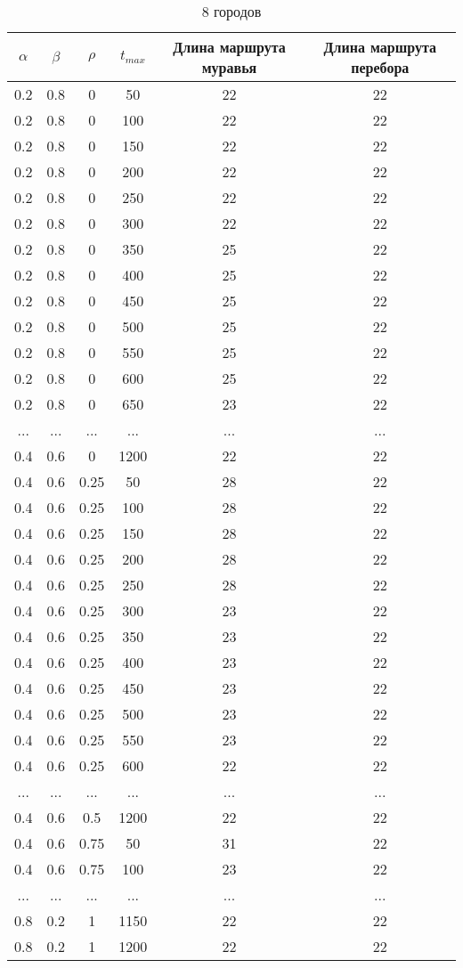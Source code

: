 \begin{table}[H]
    \centering
    \caption{8 городов}
    \label{table:city15}
    \begin{tabular}{|c|c|c|c|c|c|}
        \hline
        $\alpha$ & $\beta$ & $\rho$ & $t_{max}$ & Длина маршрута муравья & Длина маршрута перебора \\
        \hline
        0.2 & 0.8 & 0 & 50 & 22 & 22 \\
        0.2 & 0.8 & 0 & 100 & 22 & 22 \\
        0.2 & 0.8 & 0 & 150 & 22 & 22 \\
        0.2 & 0.8 & 0 & 200 & 22 & 22 \\
        0.2 & 0.8 & 0 & 250 & 22 & 22 \\
        0.2 & 0.8 & 0 & 300 & 22 & 22 \\
        0.2 & 0.8 & 0 & 350 & 25 & 22 \\
        0.2 & 0.8 & 0 & 400 & 25 & 22 \\
        0.2 & 0.8 & 0 & 450 & 25 & 22 \\
        0.2 & 0.8 & 0 & 500 & 25 & 22 \\
        0.2 & 0.8 & 0 & 550 & 25 & 22 \\
        0.2 & 0.8 & 0 & 600 & 25 & 22 \\
        0.2 & 0.8 & 0 & 650 & 23 & 22 \\
        ... & ... & ... & ... & ... & ... \\
        0.4 & 0.6 & 0 & 1200 & 22 & 22 \\
        0.4 & 0.6 & 0.25 & 50 & 28 & 22 \\
        0.4 & 0.6 & 0.25 & 100 & 28 & 22 \\
        0.4 & 0.6 & 0.25 & 150 & 28 & 22 \\
        0.4 & 0.6 & 0.25 & 200 & 28 & 22 \\
        0.4 & 0.6 & 0.25 & 250 & 28 & 22 \\
        0.4 & 0.6 & 0.25 & 300 & 23 & 22 \\
        0.4 & 0.6 & 0.25 & 350 & 23 & 22 \\
        0.4 & 0.6 & 0.25 & 400 & 23 & 22 \\
        0.4 & 0.6 & 0.25 & 450 & 23 & 22 \\
        0.4 & 0.6 & 0.25 & 500 & 23 & 22 \\
        0.4 & 0.6 & 0.25 & 550 & 23 & 22 \\
        0.4 & 0.6 & 0.25 & 600 & 22 & 22 \\
        ... & ... & ... & ... & ... & ... \\
        0.4 & 0.6 & 0.5 & 1200 & 22 & 22 \\
        0.4 & 0.6 & 0.75 & 50 & 31 & 22 \\
        0.4 & 0.6 & 0.75 & 100 & 23 & 22 \\
        ... & ... & ... & ... & ... & ... \\
        0.8 & 0.2 & 1 & 1150 & 22 & 22 \\
        0.8 & 0.2 & 1 & 1200 & 22 & 22 \\
        \hline
    \end{tabular}
\end{table}

